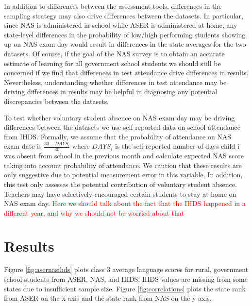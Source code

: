 \documentclass[
  11pt,
]{article}
\begin{document}
In addition to differences between the assessment tools, differences in the sampling strategy may also drive differences between the datasets. In particular, since NAS is administered in school while ASER is administered at home, any state-level differences in the probability of low/high performing students showing up on NAS exam day would result in differences in the state averages for the two datasets. Of course, if the goal of the NAS survey is to obtain an accurate estimate of learning for all government school students we should still be concerned if we find that differences in test attendance drive differences in results. Nevertheless, understanding whether differences in test attendance may be driving differences in results may be helpful in diagnosing any potential discrepancies between the datasets.

To test whether voluntary student absence on NAS exam day may be driving differences between the datasets we use self-reported data on school attendance from IHDS. Formally, we assume that
the probability of attendance on NAS exam date is \(\frac{30-DAYS_{i}}{30}\) where \(DAYS_{i}\) is the self-reported number of days child i was absent from school in the previous month and calculate expected NAS score taking into account probability of attendance. We caution that these results are only suggestive due to potential measurement error in this variable. In addition, this test only assesses the potential contribution of voluntary student absence. Teachers may have selectively encouraged certain students to stay at home on NAS exam day. \textcolor{red}{Here we should talk about the fact that the IHDS happened in a different year, and why we should not be worried about that}

\hypertarget{results}{%
\section{Results}\label{results}}

Figure \ref{fig:asernasihds} plots class 3 average language scores for rural, government school students from ASER, NAS, and IHDS. IHDS values are missing from some states due to insufficient sample size. Figure \ref{fig:correlations} plots the state rank from ASER on the x axis and the state rank from NAS on the y axis.
\end{document}
